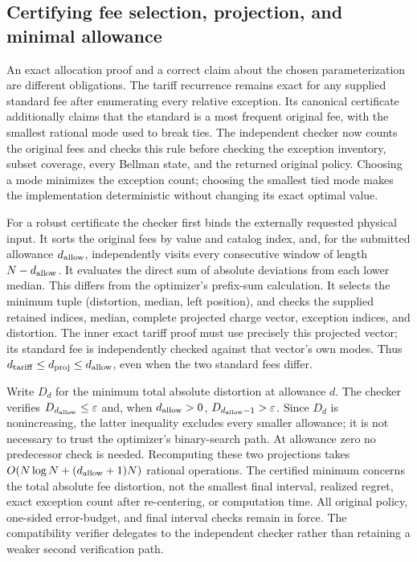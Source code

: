 \subsection{Certifying fee selection, projection, and minimal allowance}\label{sec:semantic64}
An exact allocation proof and a correct claim about the chosen parameterization are different obligations. The tariff recurrence remains exact for any supplied standard fee after enumerating every relative exception. Its canonical certificate additionally claims that the standard is a most frequent original fee, with the smallest rational mode used to break ties. The independent checker now counts the original fees and checks this rule before checking the exception inventory, subset coverage, every Bellman state, and the returned original policy. Choosing a mode minimizes the exception count; choosing the smallest tied mode makes the implementation deterministic without changing its exact optimal value.

For a robust certificate the checker first binds the externally requested physical input. It sorts the original fees by value and catalog index, and, for the submitted allowance $d_{\rm allow}$, independently visits every consecutive window of length $N-d_{\rm allow}$. It evaluates the direct sum of absolute deviations from each lower median. This differs from the optimizer's prefix-sum calculation. It selects the minimum tuple (distortion, median, left position), and checks the supplied retained indices, median, complete projected charge vector, exception indices, and distortion. The inner exact tariff proof must use precisely this projected vector; its standard fee is independently checked against that vector's own modes. Thus $d_{\rm tariff}\leq d_{\rm proj}\leq d_{\rm allow}$, even when the two standard fees differ.

Write $D_d$ for the minimum total absolute distortion at allowance $d$. The checker verifies $D_{d_{\rm allow}}\leq\varepsilon$ and, when $d_{\rm allow}>0$, $D_{d_{\rm allow}-1}>\varepsilon$. Since $D_d$ is nonincreasing, the latter inequality excludes every smaller allowance; it is not necessary to trust the optimizer's binary-search path. At allowance zero no predecessor check is needed. Recomputing these two projections takes $O(N\log N+(d_{\rm allow}+1)N)$ rational operations. The certified minimum concerns the total absolute fee distortion, not the smallest final interval, realized regret, exact exception count after re-centering, or computation time. All original policy, one-sided error-budget, and final interval checks remain in force. The compatibility verifier delegates to the independent checker rather than retaining a weaker second verification path.

